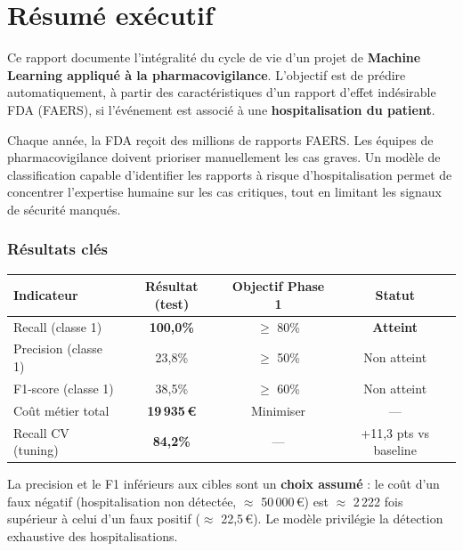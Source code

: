 \documentclass[11pt,a4paper,twoside,openright]{report}
\begin{document}
\chapter*{Résumé exécutif}

Ce rapport documente l'intégralité du cycle de vie d'un projet de \textbf{Machine Learning appliqué à la pharmacovigilance}. L'objectif est de prédire automatiquement, à partir des caractéristiques d'un rapport d'effet indésirable FDA (FAERS), si l'événement est associé à une \textbf{hospitalisation du patient}.

\begin{keybox}
Chaque année, la FDA reçoit des millions de rapports FAERS. Les équipes de pharmacovigilance doivent prioriser manuellement les cas graves. Un modèle de classification capable d'identifier les rapports à risque d'hospitalisation permet de concentrer l'expertise humaine sur les cas critiques, tout en limitant les signaux de sécurité manqués.
\end{keybox}

\subsection*{Résultats clés}

\begin{center}
\begin{tabular}{lccc}
  \toprule
  \textbf{Indicateur} & \textbf{Résultat (test)} & \textbf{Objectif Phase 1} & \textbf{Statut} \\
  \midrule
  Recall (classe 1)    & \textbf{100,0\%}  & $\geq$ 80\%  & \textcolor{success}{\textbf{Atteint}} \\
  Precision (classe 1) & 23,8\%            & $\geq$ 50\%  & \textcolor{danger}{Non atteint} \\
  F1-score (classe 1)  & 38,5\%            & $\geq$ 60\%  & \textcolor{danger}{Non atteint} \\
  Coût métier total    & \textbf{19\,935\,€} & Minimiser & — \\
  Recall CV (tuning)   & \textbf{84,2\%}   & — & +11,3 pts vs baseline \\
  \bottomrule
\end{tabular}
\end{center}

\begin{warningbox}
La precision et le F1 inférieurs aux cibles sont un \textbf{choix assumé} : le coût d'un faux négatif (hospitalisation non détectée, $\approx$ 50\,000\,€) est $\approx$ 2\,222 fois supérieur à celui d'un faux positif ($\approx$ 22,5\,€). Le modèle privilégie la détection exhaustive des hospitalisations.
\end{warningbox}
\end{document}
